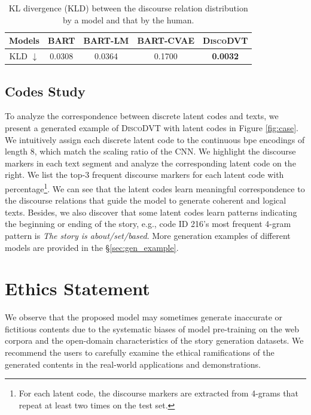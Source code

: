 \documentclass[11pt]{article}
\begin{document}
\begin{table}[t!]
    \centering
    \scriptsize
    \begin{tabular}{c | cccc}
    \toprule[1pt]
    Models & BART & BART-LM & BART-CVAE & \textsc{DiscoDVT} \\
    \midrule[0.5pt]
    KLD $\downarrow$ & 0.0308 & 0.0364 & 0.1700 & \textbf{0.0032} \\
    \bottomrule[1pt]
    \end{tabular}
    \caption{KL divergence (KLD) between the discourse relation distribution by a model and that by the human.}
    \vspace{-10pt}
    \label{tab:disc_kl}
\end{table}


\subsection{Codes Study}



To analyze the correspondence between discrete latent codes and texts, we present a generated example of \textsc{DiscoDVT} with latent codes in Figure \ref{fig:case}. We intuitively assign each discrete latent code to the continuous bpe encodings of length 8, which match the scaling ratio of the CNN. We highlight the discourse markers in each text segment and analyze the corresponding latent code on the right. We list the top-3 frequent discourse markers for each latent code with percentage\footnote{For each latent code, the discourse markers are extracted from 4-grams
that repeat at least two times on the test set.}. We can see that the latent codes learn meaningful correspondence to the discourse relations that guide the model to generate coherent and logical texts. Besides, we also discover that some latent codes learn patterns indicating the beginning or ending of the story, e.g., code ID 216's most frequent 4-gram pattern is \textit{The story is about/set/based}. More generation examples of different models are provided in the \S{\ref{sec:gen_example}}.

\section{Ethics Statement}

We observe that the proposed model may sometimes generate inaccurate or fictitious contents due to the systematic biases of model pre-training on the web corpora and the open-domain characteristics of the story generation datasets. We recommend the users to carefully examine the ethical ramifications of the generated contents in the real-world applications and demonstrations.
\end{document}
